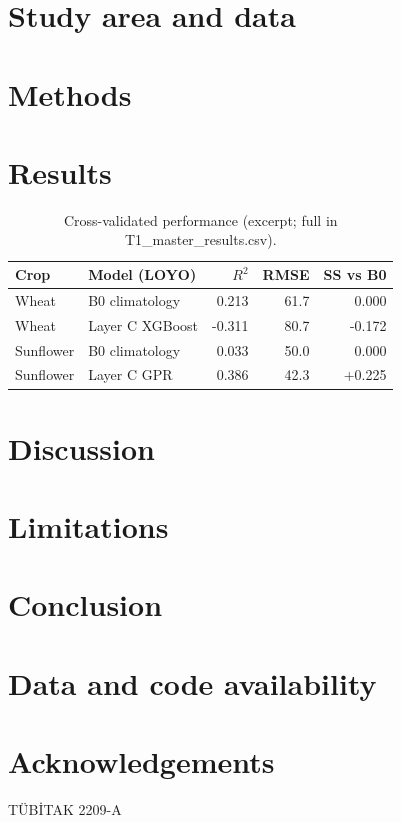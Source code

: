 \documentclass[preprint,12pt]{elsarticle}
\begin{document}
\section{Study area and data}\label{sec:data}

\section{Methods}\label{sec:methods}

\section{Results}\label{sec:results}
\begin{table}[t]\centering\caption{Cross-validated performance (excerpt; full in T1\_master\_results.csv).}
\label{tab:t1}\begin{tabular}{llrrr}\toprule
Crop & Model (LOYO) & $R^2$ & RMSE & SS vs B0\\\midrule
Wheat & B0 climatology & 0.213 & 61.7 & 0.000\\
Wheat & Layer C XGBoost & -0.311 & 80.7 & -0.172\\
Sunflower & B0 climatology & 0.033 & 50.0 & 0.000\\
Sunflower & Layer C GPR & 0.386 & 42.3 & +0.225\\\bottomrule
\end{tabular}\end{table}

\section{Discussion}\label{sec:discussion}

\section{Limitations}\label{sec:limitations}

\section{Conclusion}\label{sec:conclusion}

\section*{Data and code availability}

\section*{Acknowledgements}
T\"UB\.ITAK 2209-A %



\end{document}
